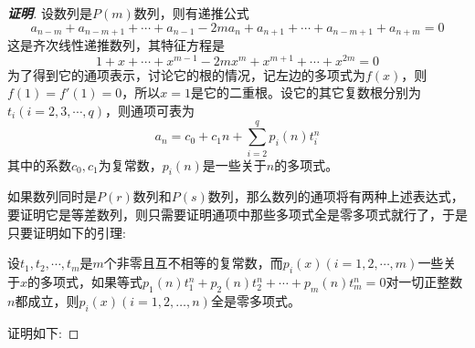 \documentclass{ctexart}
\begin{document}
\begin{proof}[\textbf{证明}]
  设数列是$P(m)$数列，则有递推公式
  \[ a_{n-m}+a_{n-m+1}+\cdots+a_{n-1}-2ma_n+a_{n+1}+\cdots+a_{n-m+1}+a_{n+m}=0 \]
  这是齐次线性递推数列，其特征方程是
  \[ 1+x+\cdots+x^{m-1}-2mx^m+x^{m+1}+\cdots+x^{2m}=0 \]
  为了得到它的通项表示，讨论它的根的情况，记左边的多项式为$f(x)$，则$f(1)=f'(1)=0$，所以$x=1$是它的二重根。设它的其它复数根分别为$t_i(i=2,3,\cdots,q)$，则通项可表为
  \[ a_n=c_0+c_1 n + \sum_{i=2}^q p_i(n)t_i^n \]
  其中的系数$c_0,c_1$为复常数，$p_i(n)$是一些关于$n$的多项式。

  如果数列同时是$P(r)$数列和$P(s)$数列，那么数列的通项将有两种上述表达式，要证明它是等差数列，则只需要证明通项中那些多项式全是零多项式就行了，于是只要证明如下的引理:
  \begin{lemma}
    设$t_1,t_2,\cdots,t_m$是$m$个非零且互不相等的复常数，而$p_i(x)(i=1,2,\cdots,m)$一些关于$x$的多项式，如果等式$p_1(n)t_1^n+p_2(n)t_2^n+\cdots+p_m(n)t_m^n=0$对一切正整数$n$都成立，则$p_i(x)(i=1,2,\ldots,n)$全是零多项式。
  \end{lemma}
  证明如下:


\end{proof}
\end{document}
